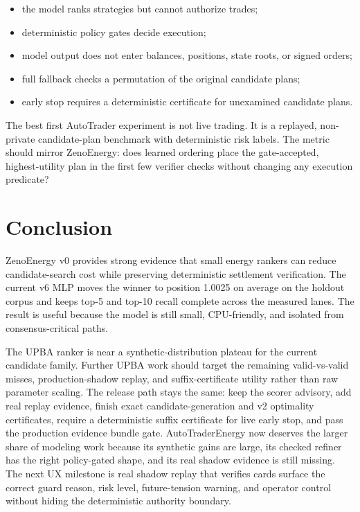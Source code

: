 \documentclass[11pt]{article}
\begin{document}
\begin{itemize}[leftmargin=*]
\item the model ranks strategies but cannot authorize trades;
\item deterministic policy gates decide execution;
\item model output does not enter balances, positions, state roots, or signed
orders;
\item full fallback checks a permutation of the original candidate plans;
\item early stop requires a deterministic certificate for unexamined candidate
plans.
\end{itemize}

The best first AutoTrader experiment is not live trading. It is a replayed,
non-private candidate-plan benchmark with deterministic risk labels. The metric
should mirror ZenoEnergy: does learned ordering place the gate-accepted,
highest-utility plan in the first few verifier checks without changing any
execution predicate?

\section{Conclusion}

ZenoEnergy v0 provides strong evidence that small energy rankers can reduce
candidate-search cost while preserving deterministic settlement verification.
The current v6 MLP moves the winner to position 1.0025 on average on the
holdout corpus and keeps top-5 and top-10 recall complete across the measured
lanes. The result is useful because the model is still small, CPU-friendly, and
isolated from consensus-critical paths.

The UPBA ranker is near a synthetic-distribution plateau for the current
candidate family. Further UPBA work should target the remaining valid-vs-valid
misses, production-shadow replay, and suffix-certificate utility rather than
raw parameter scaling. The release path stays the same: keep the scorer
advisory, add real replay evidence, finish exact candidate-generation and v2
optimality certificates, require a deterministic suffix certificate for live
early stop, and pass the production evidence bundle gate. AutoTraderEnergy now
deserves the larger share of modeling work because its synthetic gains are
large, its checked refiner has the right policy-gated shape, and its real
shadow evidence is still missing. The next UX milestone is real shadow replay
that verifies cards surface the correct guard reason, risk level,
future-tension warning, and operator control without hiding the deterministic
authority boundary.
\end{document}
